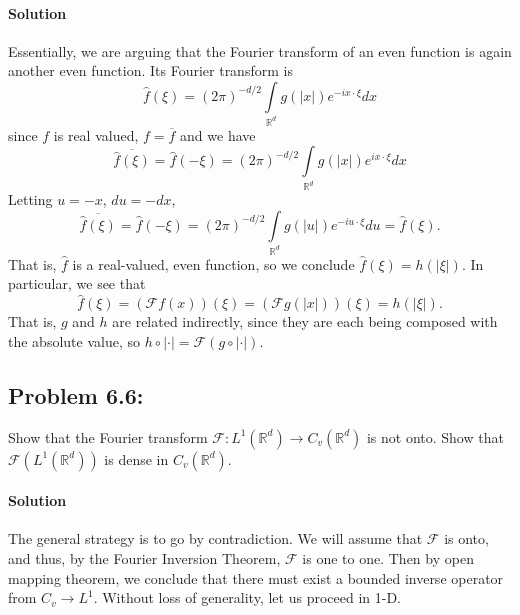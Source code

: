 \documentclass[letterpaper,twoside,11pt]{article}
\theoremstyle{mystyle}
\newcommand{\R}{{\mathbb R}}
\begin{document}
\paragraph*{Solution} Essentially, we are arguing that the Fourier transform of an even function is again another even function. Its Fourier transform is  
\[\hat f \left( \xi \right) = \left( 2\pi \right)^{-d/2} \int\limits_{\R^d} g\left( |x| \right)e^{-ix\cdot \xi} dx\]
since $f$ is real valued, $f = \overline f$ and we have 
\[\overline{\hat f \left( \xi \right)} = \hat f\left( -\xi \right) = \left( 2\pi \right)^{-d/2} \int\limits_{\R^d} g\left( |x| \right)e^{ix\cdot \xi} dx\]
Letting $u = -x$, $du = -dx$, 
\[\overline{\hat f \left( \xi \right)} = \hat f\left( -\xi \right) = \left( 2\pi \right)^{-d/2} \int\limits_{\R^d} g\left( |u| \right)e^{-iu\cdot \xi} du = \hat f \left( \xi \right).\]
That is, $\hat f$ is a real-valued, even function, so we conclude $\hat f (\xi) = h\left( |\xi| \right)$. In particular, we see that 
\[\hat f \left( \xi \right) = (\mathcal F f(x))(\xi) = \left(\mathcal F g\left( |x| \right)\right)(\xi) = h(|\xi| ). \]
That is, $g$ and $h$ are related indirectly, since they are each being composed with the absolute value, so $h\circ |\cdot | = \mathcal F\left( g\circ |\cdot | \right).$ 











\subsection*{Problem 6.6:}
Show that the Fourier transform $\mathcal F : L^1\left( \R^d \right)\to C_v\left( \R^d \right)$ is not onto. Show that $\mathcal F\left( L^1\left( \R^d \right) \right)$ is dense in $C_v\left( \R^d \right)$. 

\paragraph*{Solution} 
The general strategy is to go by contradiction. We will assume that $\mathcal F$ is onto, and thus, by the Fourier Inversion Theorem, $\mathcal F$ is one to one. Then by open mapping theorem, we conclude that there must exist a bounded inverse operator from $C_v \to L^1$. Without loss of generality, let us proceed in 1-D.  
\end{document}
